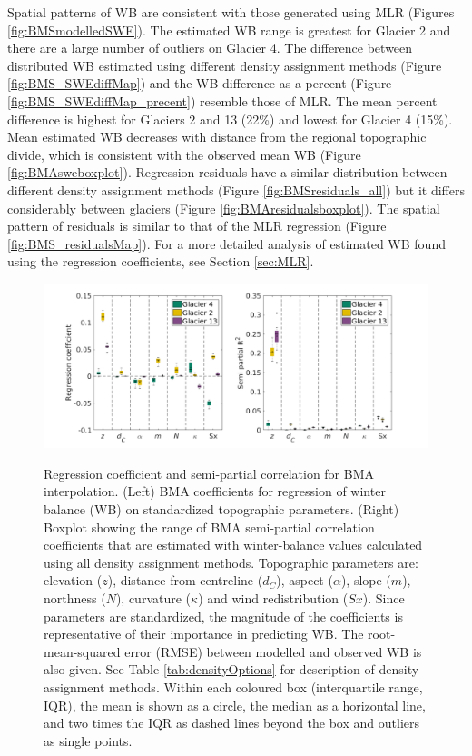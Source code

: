 \documentclass{sfuthesis}
\newcommand{\params}{Topographic parameters are: elevation ($z$), distance from centreline ($d_C$), aspect ($\alpha$), slope ($m$), northness ($N$), curvature ($\kappa$) and wind redistribution ($Sx$). }
\newcommand{\boxplot}{Within each coloured box (interquartile range, IQR), the mean is shown as a circle, the median as a horizontal line, and two times the IQR as dashed lines beyond the box and outliers as single points. }
\begin{document}
{Spatial patterns of WB are consistent with those generated using MLR (Figures \ref{fig:BMSmodelledSWE}). The estimated WB range is greatest for Glacier 2 and there are a large number of outliers on Glacier 4. The difference between distributed WB estimated using different density assignment methods (Figure \ref{fig:BMS_SWEdiffMap}) and the WB difference as a percent (Figure \ref{fig:BMS_SWEdiffMap_precent}) resemble those of MLR. The mean percent difference is highest for Glaciers 2 and 13 (22\%) and lowest for Glacier 4 (15\%). Mean estimated WB decreases with distance from the regional topographic divide, which is consistent with the observed mean WB (Figure \ref{fig:BMAsweboxplot}). Regression residuals have a similar distribution between different density assignment methods (Figure \ref{fig:BMSresiduals_all}) but it differs considerably between glaciers (Figure \ref{fig:BMAresidualsboxplot}). The spatial pattern of residuals is similar to that of the MLR regression (Figure \ref{fig:BMS_residualsMap}). For a more detailed analysis of estimated WB found using the regression coefficients, see Section \ref{sec:MLR}. 

\begin{figure}[H]
	\centering
	\includegraphics[width =1.1 \textwidth]{BMSsemiR2_DensityOpts.png}\\
	\caption[Regression coefficient and semi-partial correlation for BMA interpolation]{Regression coefficient and semi-partial correlation for BMA interpolation. (Left) BMA coefficients for regression of winter balance (WB) on standardized topographic parameters. (Right) Boxplot showing the range of BMA semi-partial correlation coefficients that are estimated with winter-balance values calculated using all density assignment methods. \params  Since parameters are standardized, the magnitude of the coefficients is representative of their importance in predicting WB. The root-mean-squared error (RMSE) between modelled and observed WB is also given. See Table \ref{tab:densityOptions} for description of density assignment methods. \boxplot }
	\label{fig:BMAsemiR2_densityOptions}
\end{figure} 
 
}
\end{document}
